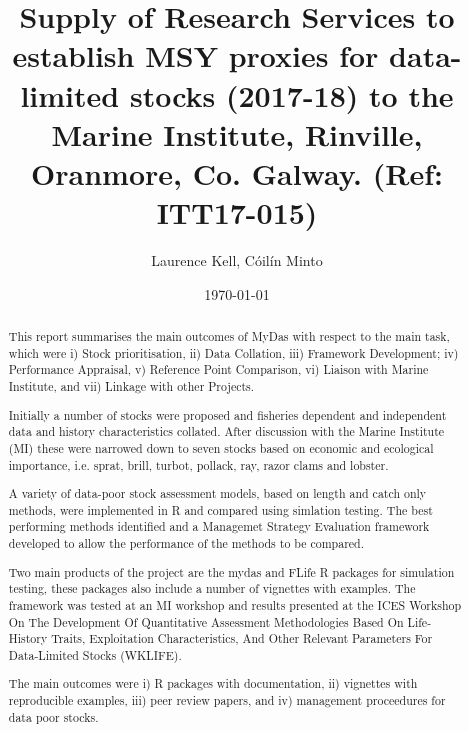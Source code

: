 \documentclass[a4paper, 10pt]{article}
\title{Supply of Research Services to establish MSY proxies for data-limited stocks (2017-18) to the Marine Institute, Rinville, Oranmore, Co. Galway.
(Ref: ITT17-015)}
\author{Laurence Kell, C\'oil\'in Minto}
\date{\today}
\begin{document}
\onehalfspacing
{}
\rhead{}

\maketitle
\thispagestyle{fancy}
\pagestyle{empty}

%

\onehalfspacing
{}
\rhead{}

\maketitle
\thispagestyle{fancy}
\pagestyle{empty}

\maketitle

\begin{abstract}

This report summarises the main outcomes of MyDas with respect to the main task, which were i) Stock prioritisation, ii) Data Collation, iii) Framework Development; iv) Performance Appraisal, v) Reference Point Comparison, vi) Liaison with Marine Institute, and vii) Linkage with other Projects.

Initially a number of stocks were proposed and fisheries dependent and independent data and history characteristics collated.  After discussion with the Marine Institute (MI) these were narrowed down to seven stocks based on economic and ecological importance, i.e. sprat, brill, turbot, pollack, ray, razor clams and lobster. 

A variety of data-poor stock assessment models, based on length and catch only methods, were  implemented in R and compared using simlation testing. The best performing methods identified and a Managemet Strategy Evaluation framework developed to allow the performance of the methods to be compared. 

Two main products of the project are the mydas and FLife R packages for simulation testing, these packages also include a number of vignettes with examples. The framework was tested at an MI workshop and results presented at the ICES Workshop On The Development Of Quantitative Assessment Methodologies Based On Life-History Traits, Exploitation Characteristics, And Other Relevant Parameters For Data-Limited Stocks (WKLIFE).

The main outcomes were i) R packages with documentation, ii)  vignettes with reproducible examples, iii) peer review papers, and iv) management proceedures for data poor stocks.


\end{abstract}
\newpage
\end{document}
